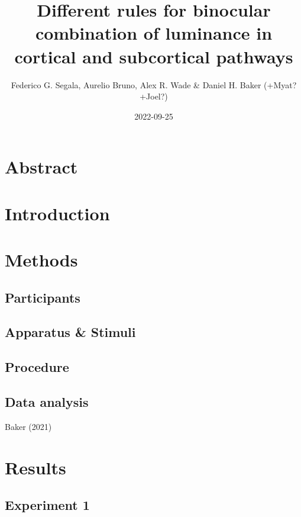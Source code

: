 \documentclass[
]{article}
\title{Different rules for binocular combination of luminance in cortical and subcortical pathways}
\author{Federico G. Segala, Aurelio Bruno, Alex R. Wade \& Daniel H. Baker (+Myat? +Joel?)}
\date{2022-09-25}
\begin{document}
\maketitle

\hypertarget{abstract}{%
\section{Abstract}\label{abstract}}

\hypertarget{introduction}{%
\section{Introduction}\label{introduction}}

\hypertarget{methods}{%
\section{Methods}\label{methods}}

\hypertarget{participants}{%
\subsection{Participants}\label{participants}}

\hypertarget{apparatus-stimuli}{%
\subsection{Apparatus \& Stimuli}\label{apparatus-stimuli}}

\hypertarget{procedure}{%
\subsection{Procedure}\label{procedure}}

\hypertarget{data-analysis}{%
\subsection{Data analysis}\label{data-analysis}}

Baker (2021)

\hypertarget{results}{%
\section{Results}\label{results}}

\hypertarget{experiment-1}{%
\subsection{Experiment 1}\label{experiment-1}}
\end{document}
